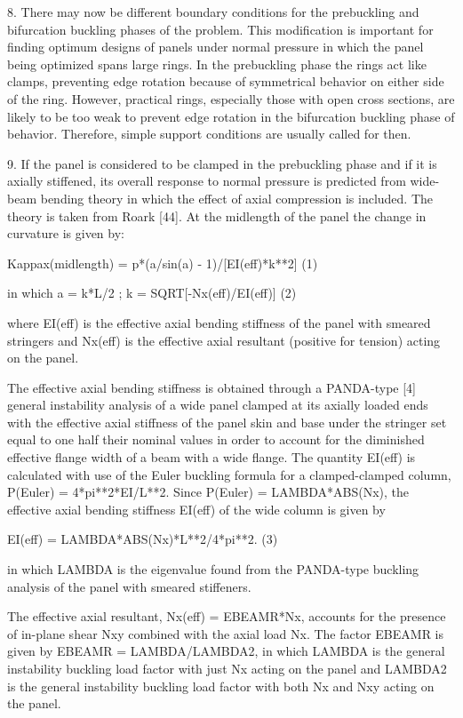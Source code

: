 8. There may now be different boundary conditions for the prebuckling and
bifurcation buckling phases of the problem.  This modification is
important for finding optimum designs of panels under normal pressure in
which the panel being optimized spans large rings. In the prebuckling
phase the rings act like clamps, preventing edge rotation because of
symmetrical behavior on either side of the ring.  However, practical
rings, especially those with open cross sections, are likely to be too
weak to prevent edge rotation in the bifurcation buckling phase of
behavior.  Therefore, simple support conditions are usually called for
then. 

9. If the panel is considered to be clamped in the prebuckling phase and
if it is axially stiffened, its overall response to normal pressure is
predicted from wide-beam bending theory in which the effect of axial
compression is included. The theory is taken from Roark [44]. At the
midlength of the panel the change in curvature is given by: 

        Kappax(midlength) = p*(a/sin(a) - 1)/[EI(eff)*k**2]    (1)

in which
           a = k*L/2 ;     k = SQRT[-Nx(eff)/EI(eff)]          (2)

where EI(eff) is the effective axial bending stiffness of the panel with
smeared stringers and Nx(eff) is the effective axial resultant (positive
for tension) acting on the panel. 

The effective axial bending stiffness is obtained through a PANDA-type [4]
general instability analysis of a wide panel clamped at its axially loaded
ends with the effective axial stiffness of the panel skin and base under
the stringer set equal to one half their nominal values in order to
account for the diminished effective flange width of a beam with a wide
flange. The quantity EI(eff) is calculated with use of the Euler buckling
formula for a clamped-clamped column,  P(Euler) = 4*pi**2*EI/L**2. Since
P(Euler) = LAMBDA*ABS(Nx), the effective axial bending stiffness EI(eff)
of the wide column is given by 

          EI(eff) = LAMBDA*ABS(Nx)*L**2/4*pi**2.               (3)

in which LAMBDA is the eigenvalue found from the PANDA-type buckling
analysis of the panel with smeared stiffeners. 

The effective axial resultant, Nx(eff) = EBEAMR*Nx, accounts for the
presence of in-plane shear Nxy combined with the axial load Nx. The factor
EBEAMR is given by EBEAMR = LAMBDA/LAMBDA2, in which LAMBDA is the general
instability buckling load factor with just Nx acting on the panel and
LAMBDA2 is the general instability buckling load factor with both Nx and
Nxy acting on the panel. 

